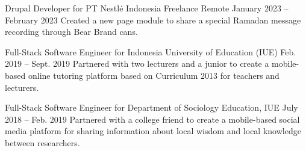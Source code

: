 \begin{cventries}
\cventry
{Drupal Developer for PT Nestlé Indonesia} %
{Freelance} %
{Remote} %
{January 2023 -- February 2023} %
{ %
Created a new page module to share a special Ramadan message recording through Bear Brand cans.
}




\cventry
{Full-Stack Software Engineer for Indonesia University of Education (IUE)} %
{} %
{} %
{Feb. 2019 -- Sept. 2019} %
{ %
Partnered with two lecturers and a junior to create a mobile-based online tutoring platform based on Curriculum 2013 for teachers and lecturers.
}


\cventry
{Full-Stack Software Engineer for Department of Sociology Education, IUE} %
{} %
{} %
{July 2018 -- Feb. 2019} %
{ %
Partnered with a college friend to create a mobile-based social media platform for sharing information about local wisdom and local knowledge between researchers.
}




\end{cventries}
